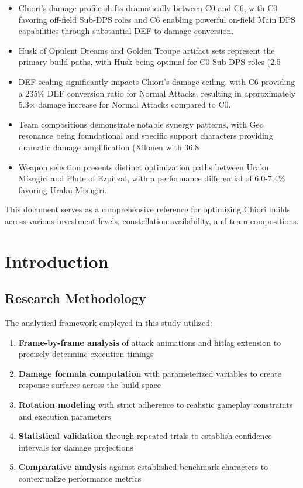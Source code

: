 \documentclass[12pt,a4paper]{article}
\begin{document}
\begin{itemize}
    \item Chiori's damage profile shifts dramatically between C0 and C6, with C0 favoring off-field Sub-DPS roles and C6 enabling powerful on-field Main DPS capabilities through substantial DEF-to-damage conversion.
    
    \item Husk of Opulent Dreams and Golden Troupe artifact sets represent the primary build paths, with Husk being optimal for C0 Sub-DPS roles (2.5%
    
    \item DEF scaling significantly impacts Chiori's damage ceiling, with C6 providing a 235\% DEF conversion ratio for Normal Attacks, resulting in approximately 5.3× damage increase for Normal Attacks compared to C0.
    
    \item Team compositions demonstrate notable synergy patterns, with Geo resonance being foundational and specific support characters providing dramatic damage amplification (Xilonen with 36.8%
    
    \item Weapon selection presents distinct optimization paths between Uraku Misugiri and Flute of Ezpitzal, with a performance differential of 6.0-7.4\% favoring Uraku Misugiri.
\end{itemize}

This document serves as a comprehensive reference for optimizing Chiori builds across various investment levels, constellation availability, and team compositions.

\section{Introduction}

\subsection{Research Methodology}

The analytical framework employed in this study utilized:

\begin{enumerate}
    \item \textbf{Frame-by-frame analysis} of attack animations and hitlag extension to precisely determine execution timings
    \item \textbf{Damage formula computation} with parameterized variables to create response surfaces across the build space
    \item \textbf{Rotation modeling} with strict adherence to realistic gameplay constraints and execution parameters
    \item \textbf{Statistical validation} through repeated trials to establish confidence intervals for damage projections
    \item \textbf{Comparative analysis} against established benchmark characters to contextualize performance metrics
\end{enumerate}
\end{document}
